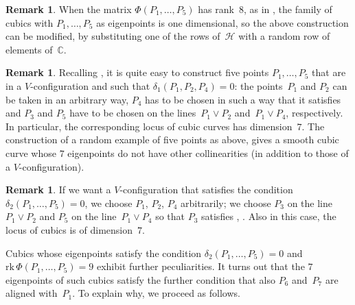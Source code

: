 \documentclass{amsart}
\theoremstyle{plain}
\theoremstyle{definition}
\newtheorem{rmk}[lemma]{Remark}
\newcommand{\C}{\mathbb{C}}
\newcommand{\rk}{\ensuremath{\mathrm{rk}}}
\begin{document}
\begin{rmk}
When the matrix $\Phi(P_1, \dots, P_5)$ has rank~$8$, as in , the family of
cubics with $P_1, \dots, P_5$ as eigenpoints is one dimensional, so the
above construction can be modified, by substituting one of the rows of~$\mathcal{H}$ with a random row of elements of~$\C$.
\end{rmk}

\begin{rmk}
\label{rmk:construction_five_d1}
Recalling , it is quite easy to construct five points $P_1, \dots, P_5$ that are in a $V$-configuration
and such that $\delta_1(P_1, P_2, P_4)= 0$: the points~$P_1$
and $P_2$ can be taken in an arbitrary way, $P_4$ has to be chosen in such
a way that it satisfies 
and $P_3$ and $P_5$ have to be chosen on the lines~$P_1 \vee P_2$ and~$P_1 \vee P_4$,
respectively. In particular, the corresponding locus of cubic curves
has dimension~$7$.
The construction of a random example
of five points as above, gives a smooth cubic curve whose $7$ eigenpoints
do not have other collinearities (in addition to those of a
$V$-configuration).
\end{rmk}

\begin{rmk}
\label{rmk:construction_five_d2}
If we want a $V$-configuration that satisfies the condition
$\delta_2(P_1, \dots, P_5) = 0$, we choose $P_1$, $P_2$, $P_4$ arbitrarily;
we choose $P_3$ on the line~$P_1 \vee P_2$ and $P_5$ on the line~$P_1 \vee P_4$ so that $P_3$ satisfies , .
Also in this case, the locus of cubics is of dimension~$7$.
\end{rmk}

Cubics whose eigenpoints satisfy the condition $\delta_2(P_1, \dotsc, P_5) = 0$ and $\rk \, \Phi(P_1, \dotsc, P_5) = 9$ exhibit further peculiarities. It turns out that the $7$ eigenpoints of such cubics satisfy the further
condition that also $P_6$ and~$P_7$ are aligned with~$P_1$. To explain
why, we proceed as follows.
\end{document}
